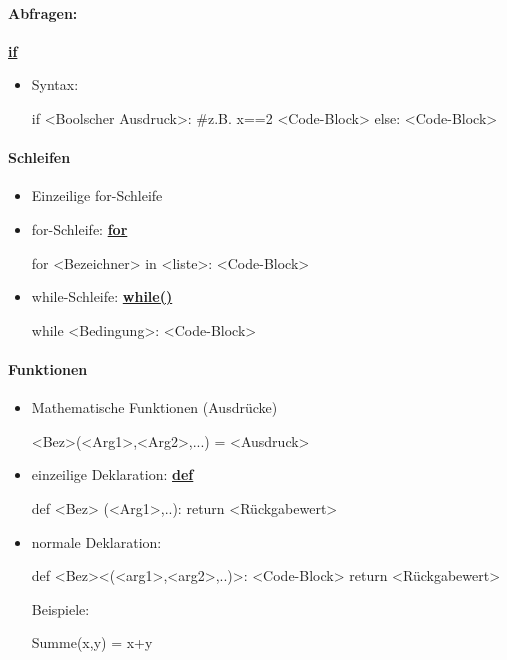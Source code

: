 \documentclass[a4paper,9pt,DIV15,twocolumn]{scrartcl}
\begin{document}
{\paragraph{Abfragen:} \href{http://docs.python.org/reference/compound_stmts.html#the-if-statement}{\textbf{if}}
\begin{itemize}
 \item  Syntax: \begin{sageinsmall}
if <Boolscher Ausdruck>:	#z.B. x==2
    <Code-Block>
else:
    <Code-Block>
\end{sageinsmall}
\end{itemize}

\paragraph{Schleifen}
\begin{itemize}
\item Einzeilige for-Schleife
    \begin{sageinsmall}
    \end{sageinsmall}
\item for-Schleife: \href{http://docs.python.org/tutorial/controlflow.html#for-statements}{\textbf{for}}
    \begin{sageinsmall}
for <Bezeichner> in <liste>:
    <Code-Block>
    \end{sageinsmall}
  \item while-Schleife: \href{http://docs.python.org/reference/compound_stmts.html#the-while-statement}{\textbf{while()}}
\begin{sageinsmall}
while <Bedingung>:
    <Code-Block>
\end{sageinsmall}
\end{itemize}

\paragraph{Funktionen}
\begin{itemize}
 \item Mathematische Funktionen (Ausdrücke)
\begin{sageinsmall}
<Bez>(<Arg1>,<Arg2>,...) = <Ausdruck>
\end{sageinsmall}
    \item einzeilige Deklaration: \href{http://docs.python.org/reference/compound_stmts.html#function-definitions}{\textbf{def}}     
        \begin{sageinsmall}
def <Bez> (<Arg1>,..): return <Rückgabewert>            
        \end{sageinsmall}
 \item normale Deklaration:
\begin{sageinsmall}
def <Bez><(<arg1>,<arg2>,..)>:
    <Code-Block>
    return <Rückgabewert>
\end{sageinsmall}
Beispiele:
\begin{sageinsmall}
Summe(x,y) = x+y


\end{sageinsmall}
\end{itemize}}
\end{document}
